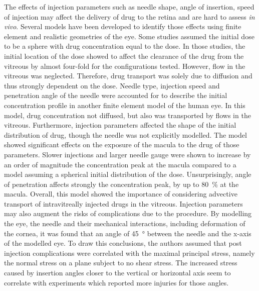 \documentclass[12pt,a4paper]{journal}
\begin{document}
The effects of injection parameters such as needle shape, angle of insertion, speed of injection may affect the delivery of drug to the retina and are hard to assess \textit{in vivo}.
Several models have been developed to identify those effects using finite element and realistic geometries of the eye.
Some studies assumed the initial dose to be a sphere with drug concentration equal to the dose.\cite{Friedrich_1997,Friedrich_1997a}
In those studies, the initial location of the dose showed to affect the clearance of the drug from the vitreous by almost four-fold for the configurations tested.\cite{Friedrich_1997}
However, flow in the vitreous was neglected.
Therefore, drug transport was solely due to diffusion and thus strongly dependent on the dose.\cite{Friedrich_1997}
Needle type, injection speed and penetration angle of the needle were accounted for to describe the initial concentration profile in another finite element model of the human eye.\cite{Jooybar_2014}
In this model, drug concentration not diffused, but also was transported by flows in the vitreous.
Furthermore, injection parameters affected the shape of the initial distribution of drug, though the needle was not explicitly modelled.
The model showed significant effects on the exposure of the macula to the drug of those parameters.
Slower injections and larger needle gauge were shown to increase by an order of magnitude the concentration peak at the macula compared to a model assuming a spherical initial distribution of the dose.
Unsurprisingly, angle of penetration affects strongly the concentration peak, by up to \SI{80}{\percent} at the macula.\cite{Jooybar_2014}
Overall, this model showed the importance of considering advective transport of intravitreally injected drugs in the vitreous. 
Injection parameters may also augment the risks of complications due to the procedure.
By modelling the eye, the needle and their mechanical interactions, including deformation of the cornea, it was found that an angle of \SI{45}{\degree} between the needle and the x-axis of the modelled eye.\cite{Karimi_2018}
To draw this conclusions, the authors assumed that post injection complications were correlated with the maximal principal stress, namely the normal stress on a plane subject to no shear stress.  
The increased stress caused by insertion angles closer to the vertical or horizontal axis seem to correlate with experiments which reported more injuries for those angles.\cite{Karimi_2018}
\end{document}
